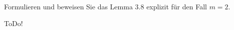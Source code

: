 
\begin{exercise}

Formulieren und beweisen Sie das Lemma $3.8$ explizit für den Fall $m=2$.

\end{exercise}


\begin{solution}

ToDo!

\end{solution}

